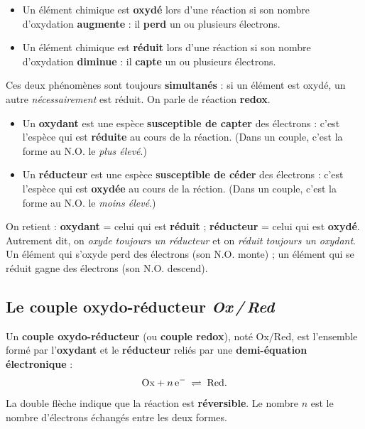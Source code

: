 \documentclass[11pt,a4paper]{article}
\newcommand{\NO}{\ensuremath{\mathrm{N.O.}}}    %
\begin{document}
\begin{definition}
\begin{itemize}[leftmargin=1.6em,topsep=1pt,itemsep=2pt]
  \item Un élément chimique est \textbf{oxydé} lors d'une réaction si son nombre d'oxydation
        \textbf{augmente} : il \textbf{perd} un ou plusieurs électrons.
  \item Un élément chimique est \textbf{réduit} lors d'une réaction si son nombre d'oxydation
        \textbf{diminue} : il \textbf{capte} un ou plusieurs électrons.
\end{itemize}
Ces deux phénomènes sont toujours \textbf{simultanés} : si un élément est oxydé, un autre
\emph{nécessairement} est réduit. On parle de réaction \textbf{redox}.
\end{definition}

\begin{definition}
\begin{itemize}[leftmargin=1.6em,topsep=1pt,itemsep=2pt]
  \item Un \textbf{oxydant} est une espèce \textbf{susceptible de capter} des électrons : c'est
        l'espèce qui est \textbf{réduite} au cours de la réaction. (Dans un couple, c'est la forme
        au $\NO$ le \emph{plus élevé}.)
  \item Un \textbf{réducteur} est une espèce \textbf{susceptible de céder} des électrons : c'est
        l'espèce qui est \textbf{oxydée} au cours de la réction. (Dans un couple, c'est la forme au
        $\NO$ le \emph{moins élevé}.)
\end{itemize}
\end{definition}

\begin{remarque}
On retient : \og \textbf{oxydant} = celui qui est \textbf{réduit} ; \textbf{réducteur} = celui qui est
\textbf{oxydé}\fg{}. Autrement dit, on \emph{oxyde toujours un réducteur} et on \emph{réduit toujours
un oxydant}. Un élément qui s'oxyde perd des électrons (son $\NO$ monte) ; un élément qui se réduit
gagne des électrons (son $\NO$ descend).
\end{remarque}

\subsection{Le couple oxydo-réducteur \emph{Ox\,/\,Red}}

\begin{definition}
Un \textbf{couple oxydo-réducteur} (ou \textbf{couple redox}), noté $\mathrm{Ox}/\mathrm{Red}$,
est l'ensemble formé par l'\textbf{oxydant} et le \textbf{réducteur} reliés par une
\textbf{demi-équation électronique} :
\[
\mathrm{Ox}+n\,\ce{e^-}\;\rightleftharpoons\;\mathrm{Red}.
\]
La double flèche indique que la réaction est \textbf{réversible}. Le nombre $n$ est le nombre
d'électrons échangés entre les deux formes.
\end{definition}
\end{document}
